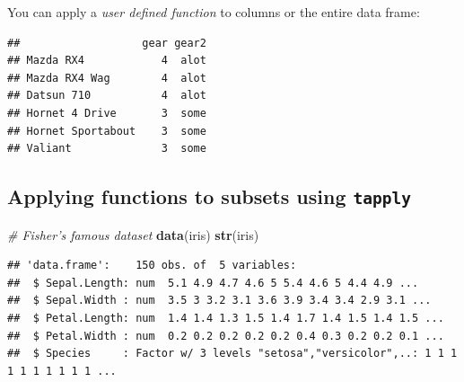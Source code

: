 \documentclass[]{book}
\makeatletter
\newenvironment{Shaded}{\begin{snugshade}}{\end{snugshade}}
\newcommand{\KeywordTok}[1]{\textcolor[rgb]{0.13,0.29,0.53}{\textbf{#1}}}
\newcommand{\DecValTok}[1]{\textcolor[rgb]{0.00,0.00,0.81}{#1}}
\newcommand{\StringTok}[1]{\textcolor[rgb]{0.31,0.60,0.02}{#1}}
\newcommand{\CommentTok}[1]{\textcolor[rgb]{0.56,0.35,0.01}{\textit{#1}}}
\newcommand{\ControlFlowTok}[1]{\textcolor[rgb]{0.13,0.29,0.53}{\textbf{#1}}}
\newcommand{\OperatorTok}[1]{\textcolor[rgb]{0.81,0.36,0.00}{\textbf{#1}}}
\newcommand{\NormalTok}[1]{#1}
\newenvironment{kframe}{%
\medskip{}
\setlength{\fboxsep}{.8em}
 \def\at@end@of@kframe{}%
 \ifinner\ifhmode%
  \def\at@end@of@kframe{\end{minipage}}%
  \begin{minipage}{\columnwidth}%
 \fi\fi%
 \def\FrameCommand##1{\hskip\@totalleftmargin \hskip-\fboxsep
 \colorbox{shadecolor}{##1}\hskip-\fboxsep
     \hskip-\linewidth \hskip-\@totalleftmargin \hskip\columnwidth}%
 \MakeFramed {\advance\hsize-\width
   \@totalleftmargin\z@ \linewidth\hsize
   \@setminipage}}%
 {\par\unskip\endMakeFramed%
 \at@end@of@kframe}
\renewenvironment{Shaded}{\begin{kframe}}{\end{kframe}}
\theoremstyle{definition}
\theoremstyle{definition}
\theoremstyle{definition}
\theoremstyle{remark}
\makeatother
\begin{document}
You can apply a \emph{user defined function} to columns or the entire
data frame:

\begin{Shaded}
\end{Shaded}

\begin{verbatim}
##                   gear gear2
## Mazda RX4            4  alot
## Mazda RX4 Wag        4  alot
## Datsun 710           4  alot
## Hornet 4 Drive       3  some
## Hornet Sportabout    3  some
## Valiant              3  some
\end{verbatim}

\subsection{\texorpdfstring{Applying functions to subsets using
\texttt{tapply}}{Applying functions to subsets using tapply}}\label{applying-functions-to-subsets-using-tapply}

\begin{Shaded}
\begin{Highlighting}[]
\CommentTok{# Fisher's famous dataset }
\KeywordTok{data}\NormalTok{(iris)}
\KeywordTok{str}\NormalTok{(iris)}
\end{Highlighting}
\end{Shaded}

\begin{verbatim}
## 'data.frame':    150 obs. of  5 variables:
##  $ Sepal.Length: num  5.1 4.9 4.7 4.6 5 5.4 4.6 5 4.4 4.9 ...
##  $ Sepal.Width : num  3.5 3 3.2 3.1 3.6 3.9 3.4 3.4 2.9 3.1 ...
##  $ Petal.Length: num  1.4 1.4 1.3 1.5 1.4 1.7 1.4 1.5 1.4 1.5 ...
##  $ Petal.Width : num  0.2 0.2 0.2 0.2 0.2 0.4 0.3 0.2 0.2 0.1 ...
##  $ Species     : Factor w/ 3 levels "setosa","versicolor",..: 1 1 1 1 1 1 1 1 1 1 ...
\end{verbatim}
\end{document}
